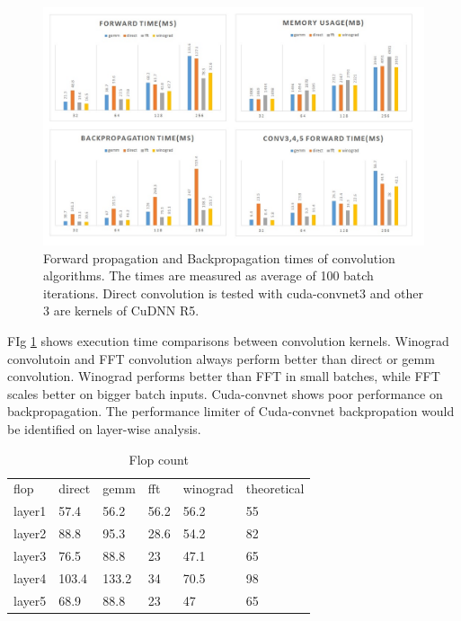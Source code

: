 \documentclass[conference]{IEEEtran}
\begin{document}
\begin{figure}
  \centering
  \includegraphics[width=\linewidth]{./figures/conv_time}
  \caption{Forward propagation and Backpropagation times of convolution algorithms. The times are measured as average of 100 batch iterations. 
Direct convolution is tested with cuda-convnet3 and other 3 are kernels of CuDNN R5. }
  \label{fig_conv_time}
\end{figure}

FIg \ref{fig_conv_time} shows execution time comparisons between convolution kernels.
Winograd convolutoin and FFT convolution always perform better than direct or gemm convolution.
Winograd performs better than FFT in small batches, while FFT scales better on bigger batch inputs.
Cuda-convnet shows poor performance on backpropagation.
The performance limiter of Cuda-convnet backpropation would be identified on layer-wise analysis.

\begin{table}[]
\centering
\caption{Flop count}
\label{my-label1}
\begin{tabular}{llllll}
flop   & direct & gemm  & fft  & winograd & theoretical \\
layer1 & 57.4   & 56.2  & 56.2 & 56.2     & 55          \\
layer2 & 88.8   & 95.3  & 28.6 & 54.2     & 82          \\
layer3 & 76.5   & 88.8  & 23   & 47.1     & 65          \\
layer4 & 103.4  & 133.2 & 34   & 70.5     & 98          \\
layer5 & 68.9   & 88.8  & 23   & 47       & 65         
\end{tabular}
\end{table}
\end{document}
